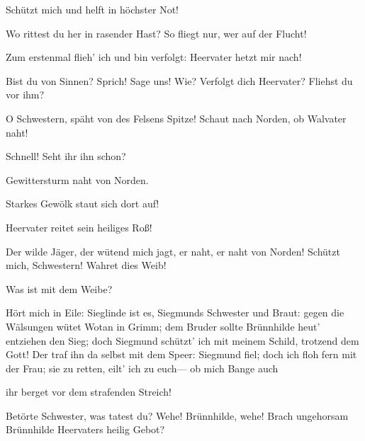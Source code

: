 \begin{drama}
Schützt mich und helft in höchster Not!
 

Wo rittest du her in rasender Hast?
So fliegt nur, wer auf der Flucht!
 

\Brunnhildespeaks
Zum erstenmal flieh' ich und bin verfolgt:
Heervater hetzt mir nach!
 



Bist du von Sinnen? Sprich! Sage uns! Wie?
Verfolgt dich Heervater?
Fliehst du vor ihm?
 

\Brunnhildespeaks


O Schwestern, späht von des Felsens Spitze!
Schaut nach Norden, ob Walvater naht!
 



Schnell! Seht ihr ihn schon?
 

\Ortlindespeaks
Gewittersturm naht von Norden.
 

\Waltrautespeaks
Starkes Gewölk staut sich dort auf!
 

Heervater reitet sein heiliges Roß!
 

\Brunnhildespeaks
Der wilde Jäger, der wütend mich jagt,
er naht, er naht von Norden!
Schützt mich, Schwestern! Wahret dies Weib!
 

Was ist mit dem Weibe?
 

\Brunnhildespeaks
Hört mich in Eile:
Sieglinde ist es, Siegmunds Schwester und Braut:
gegen die Wälsungen
wütet Wotan in Grimm;
dem Bruder sollte Brünnhilde heut'
entziehen den Sieg;
doch Siegmund schützt' ich mit meinem Schild,
trotzend dem Gott!
Der traf ihn da selbst mit dem Speer:
Siegmund fiel;
doch ich floh fern mit der Frau;
sie zu retten, eilt' ich zu euch---
ob mich Bange auch
 



ihr berget vor dem strafenden Streich!
 



Betörte Schwester, was tatest du?
Wehe! Brünnhilde, wehe!
Brach ungehorsam
Brünnhilde Heervaters heilig Gebot?
 


\end{drama}
